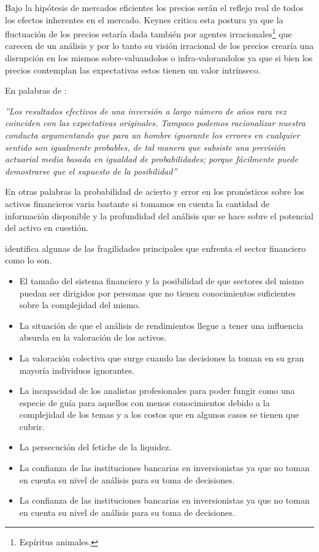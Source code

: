 \documentclass[letterpaper,12pt,oneside]{book}
\begin{document}
Bajo la hipótesis de mercados eficientes los precios serán el reflejo real de todos los efectos inherentes en el mercado. Keynes critica esta postura ya que la fluctuación de los precios estaría dada también por agentes irracionales\footnote{Espíritus animales.} que carecen de un análisis y por lo tanto su visión irracional de los precios crearía una disrupción en los mismos sobre-valuandolos o infra-valorandolos ya que si bien los precios contemplan las expectativas estos tienen un valor intrínseco.

En palabras de \cite{a12}:

\textit{''Los resultados efectivos de una inversión a largo número de años rara vez coinciden con las expectativas originales. Tampoco podemos racionalizar nuestra conducta argumentando que para un hombre ignorante los errores en cualquier sentido son igualmente probables, de tal manera que subsiste una previsión actuarial media basada en igualdad de probabilidades; porque fácilmente puede demostrarse que el supuesto de la posibilidad''}

En otras palabras la probabilidad de acierto y error en los pronósticos sobre los activos financieros varia bastante si tomamos en cuenta la cantidad de información disponible y la profundidad del análisis que se hace sobre el potencial del activo en cuestión.

\cite{a12} identifica algunas de las fragilidades principales que enfrenta el sector financiero como lo son.

\begin{itemize}

\item El tamaño del sistema financiero y la posibilidad de que sectores del mismo puedan ser dirigidos por personas que no tienen conocimientos suficientes sobre la complejidad del mismo.

\item La situación de que el análisis de rendimientos llegue a tener una influencia absurda en la valoración de los activos.

\item La valoración colectiva que surge cuando las decisiones la toman en su gran mayoría individuos ignorantes.

\item La incapacidad de los analistas profesionales para poder fungir como una especie de guía para aquellos con menos conocimientos debido a la complejidad de los temas y a los costos que en algunos casos se tienen que cubrir.

\item La persecución del fetiche de la liquidez.

\item La confianza de las instituciones bancarias en inversionistas ya que no toman en cuenta su nivel de análisis para su toma de decisiones.

\item La confianza de las instituciones bancarias en inversionistas ya que no toman en cuenta su nivel de análisis para su toma de decisiones.

\end{itemize}
\end{document}
